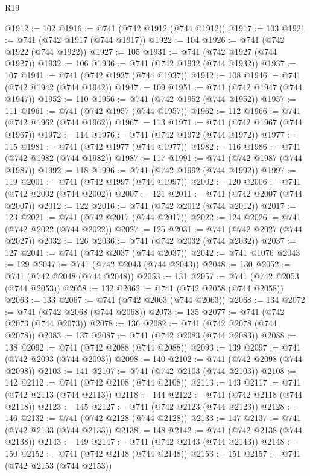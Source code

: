 \begin{lexlean}{R19}
\begin{coremodule}
@1912 := 102
@1916 := @741 (@742 @1912 (@744 @1912))
@1917 := 103
@1921 := @741 (@742 @1917 (@744 @1917))
@1922 := 104
@1926 := @741 (@742 @1922 (@744 @1922))
@1927 := 105
@1931 := @741 (@742 @1927 (@744 @1927))
@1932 := 106
@1936 := @741 (@742 @1932 (@744 @1932))
@1937 := 107
@1941 := @741 (@742 @1937 (@744 @1937))
@1942 := 108
@1946 := @741 (@742 @1942 (@744 @1942))
@1947 := 109
@1951 := @741 (@742 @1947 (@744 @1947))
@1952 := 110
@1956 := @741 (@742 @1952 (@744 @1952))
@1957 := 111
@1961 := @741 (@742 @1957 (@744 @1957))
@1962 := 112
@1966 := @741 (@742 @1962 (@744 @1962))
@1967 := 113
@1971 := @741 (@742 @1967 (@744 @1967))
@1972 := 114
@1976 := @741 (@742 @1972 (@744 @1972))
@1977 := 115
@1981 := @741 (@742 @1977 (@744 @1977))
@1982 := 116
@1986 := @741 (@742 @1982 (@744 @1982))
@1987 := 117
@1991 := @741 (@742 @1987 (@744 @1987))
@1992 := 118
@1996 := @741 (@742 @1992 (@744 @1992))
@1997 := 119
@2001 := @741 (@742 @1997 (@744 @1997))
@2002 := 120
@2006 := @741 (@742 @2002 (@744 @2002))
@2007 := 121
@2011 := @741 (@742 @2007 (@744 @2007))
@2012 := 122
@2016 := @741 (@742 @2012 (@744 @2012))
@2017 := 123
@2021 := @741 (@742 @2017 (@744 @2017))
@2022 := 124
@2026 := @741 (@742 @2022 (@744 @2022))
@2027 := 125
@2031 := @741 (@742 @2027 (@744 @2027))
@2032 := 126
@2036 := @741 (@742 @2032 (@744 @2032))
@2037 := 127
@2041 := @741 (@742 @2037 (@744 @2037))
@2042 := @741 @1076
@2043 := 129
@2047 := @741 (@742 @2043 (@744 @2043))
@2048 := 130
@2052 := @741 (@742 @2048 (@744 @2048))
@2053 := 131
@2057 := @741 (@742 @2053 (@744 @2053))
@2058 := 132
@2062 := @741 (@742 @2058 (@744 @2058))
@2063 := 133
@2067 := @741 (@742 @2063 (@744 @2063))
@2068 := 134
@2072 := @741 (@742 @2068 (@744 @2068))
@2073 := 135
@2077 := @741 (@742 @2073 (@744 @2073))
@2078 := 136
@2082 := @741 (@742 @2078 (@744 @2078))
@2083 := 137
@2087 := @741 (@742 @2083 (@744 @2083))
@2088 := 138
@2092 := @741 (@742 @2088 (@744 @2088))
@2093 := 139
@2097 := @741 (@742 @2093 (@744 @2093))
@2098 := 140
@2102 := @741 (@742 @2098 (@744 @2098))
@2103 := 141
@2107 := @741 (@742 @2103 (@744 @2103))
@2108 := 142
@2112 := @741 (@742 @2108 (@744 @2108))
@2113 := 143
@2117 := @741 (@742 @2113 (@744 @2113))
@2118 := 144
@2122 := @741 (@742 @2118 (@744 @2118))
@2123 := 145
@2127 := @741 (@742 @2123 (@744 @2123))
@2128 := 146
@2132 := @741 (@742 @2128 (@744 @2128))
@2133 := 147
@2137 := @741 (@742 @2133 (@744 @2133))
@2138 := 148
@2142 := @741 (@742 @2138 (@744 @2138))
@2143 := 149
@2147 := @741 (@742 @2143 (@744 @2143))
@2148 := 150
@2152 := @741 (@742 @2148 (@744 @2148))
@2153 := 151
@2157 := @741 (@742 @2153 (@744 @2153))

\end{coremodule}
\end{lexlean}
